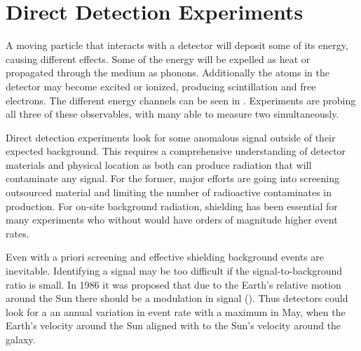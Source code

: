 






 \section[Direct Detection Experiments][Direct Detection Experiments]{Direct Detection Experiments}
 \label{sec:direct_detect}
 A moving particle that interacts with a detector will deposit some of its energy, causing different effects.  Some of the energy
 will be expelled as heat or propagated through the medium as phonons.  Additionally the atoms in the detector may become
 excited or ionized, producing scintillation and free electrons.  The different energy channels can be seen in
 .  Experiments are probing all three of these observables, with many able to measure two
 simultaneously.
 
 Direct detection experiments look for some anomalous signal outside of their expected background.  This requires a comprehensive
 understanding of detector materials and physical location as both can produce radiation that will contaminate any signal.  For the
 former, major efforts are going into screening outsourced material and limiting the number of radioactive contaminates in
 production.  For on-site background radiation, shielding has been essential for many experiments who without would have orders
 of magnitude higher event rates.
 
 Even with a priori screening and effective shielding background events are inevitable.  Identifying a signal may be too
 difficult if the signal-to-background ratio is small.  In 1986 it was proposed
 that due to the Earth's relative motion around the Sun there should be a modulation in signal ().  Thus
 detectors could look for a an annual variation in event rate with a maximum in May, when the Earth's velocity around the
 Sun aligned with to the Sun's velocity around the galaxy.

